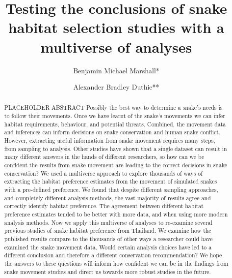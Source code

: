 \documentclass[10pt,a4paper]{article}
\begin{document}
\pagestyle{fancy}

\title{Testing the conclusions of snake habitat selection studies with a multiverse of analyses}
\author[1]{Benjamin Michael Marshall*}
\author[1]{Alexander Bradley Duthie**}


\maketitle
\thispagestyle{fancy}

\begin{abstract}

PLACEHOLDER ABSTRACT Possibly the best way to determine a snake's needs is to follow their movements. Once we have learnt of the snake's movements we can infer habitat requirements, behaviour, and potential threats. Combined, the movement data and inferences can inform decisions on snake conservation and human snake conflict. However, extracting useful information from snake movement requires many steps, from sampling to analysis. Other studies have shown that a single dataset can result in many different answers in the hands of different researchers, so how can we be confident the results from snake movement are leading to the correct decisions in snake conservation? We used a multiverse approach to explore thousands of ways of extracting the habitat preference estimates from the movement of simulated snakes with a pre-defined preference. We found that despite different sampling approaches, and completely different analysis methods, the vast majority of results agree and correctly identify habitat preference. The agreement between different habitat preference estimates tended to be better with more data, and when using more modern analysis methods. Now we apply this multiverse of analyses to re-examine several previous studies of snake habitat preference from Thailand. We examine how the published results compare to the thousands of other ways a researcher could have examined the snake movement data. Would certain analysis choices have led to a different conclusion and therefore a different conservation recommendation? We hope the answers to these questions will inform how confident we can be in the findings from snake movement studies and direct us towards more robust studies in the future.

\end{abstract}
\end{document}
